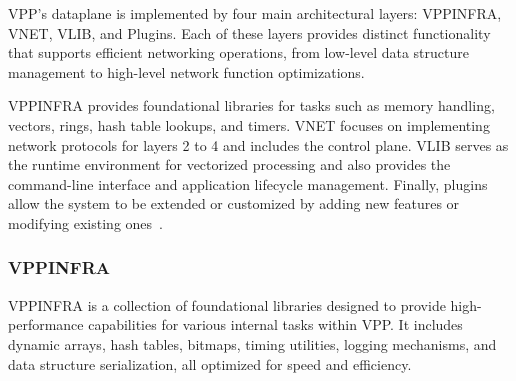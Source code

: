VPP’s dataplane is implemented by four main architectural layers: VPPINFRA, VNET, VLIB, and Plugins. 
Each of these layers provides distinct functionality that supports efficient networking operations, from low-level data structure management to high-level network function optimizations.

VPPINFRA provides foundational libraries for tasks such as memory handling, vectors, rings, hash table lookups, and timers. 
VNET focuses on implementing network protocols for layers 2 to 4 and includes the control plane. 
VLIB serves as the runtime environment for vectorized processing and also provides the command-line interface and application lifecycle management. 
Finally, plugins allow the system to be extended or customized by adding new features or modifying existing ones~\cite{fdio-vpp-softwarearchitecture-2506}.

\subsubsection{VPPINFRA}
VPPINFRA is a collection of foundational libraries designed to provide high-performance capabilities for various internal tasks within VPP. 
It includes dynamic arrays, hash tables, bitmaps, timing utilities, logging mechanisms, and data structure serialization, all optimized for speed and efficiency.


